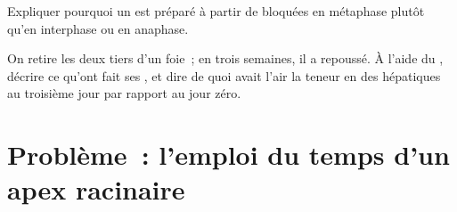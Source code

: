\begin{exercise}[$\star\star\star$]\label{exo:g11:cell-cycle-mitosis:14}
Expliquer pourquoi un  est préparé à partir de 
bloquées en métaphase plutôt qu'en interphase ou en anaphase.
\end{exercise}

\begin{exercise}[$\star\star\star$]\label{exo:g11:cell-cycle-mitosis:15}
On retire les deux tiers d'un foie~; en trois semaines, il a repoussé.
À l'aide du , décrire ce qu'ont fait ses , et
dire de quoi avait l'air la teneur en  des  hépatiques au
troisième jour par rapport au jour zéro.
\end{exercise}

\section{Problème~: l'emploi du temps d'un apex racinaire}

